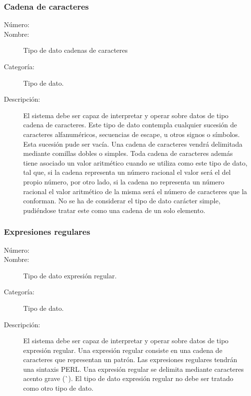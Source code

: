 \subsubsection{Cadena de caracteres}
\begin{framed}
	\begin{description}
		\item [Número:] \cn
		\item [Nombre:] Tipo de dato cadenas de caracteres
		\item [Categoría:] Tipo de dato.
		\item [Descripción:] El sistema debe ser capaz de interpretar y operar sobre datos de tipo cadena de caracteres. Este tipo
		de dato contempla cualquier sucesión de caracteres alfanuméricos, secuencias de escape, u otros signos o símbolos. Esta sucesión pude
		ser vacía. Una cadena de caracteres vendrá delimitada mediante comillas dobles o simples. Toda cadena de caracteres además tiene asociado
		un valor aritmético cuando se utiliza como este tipo de dato, tal que, si la cadena representa un número racional el valor será el del
		propio número, por otro lado, si la cadena
		no representa un número racional el valor aritmético de la misma será el número de caracteres que la conforman.  No se ha de considerar el tipo de dato carácter simple, pudiéndose tratar este como una cadena de un solo elemento.
	\end {description}
\end{framed}

\subsubsection{Expresiones regulares}
\begin{framed}
	\begin{description}
		\item [Número:] \cn
		\item [Nombre:] Tipo de dato expresión regular.
		\item [Categoría:] Tipo de dato.
		\item [Descripción:] El sistema debe ser capaz de interpretar y operar sobre datos de tipo expresión regular. Una expresión regular
		consiste en una cadena de caracteres que representan un patrón. Las expresiones regulares tendrán una sintaxis PERL. Una expresión regular
		se delimita mediante caracteres acento grave (\`\ ). El tipo de dato expresión regular no debe ser tratado como otro tipo de dato.
	\end {description}
\end{framed}

